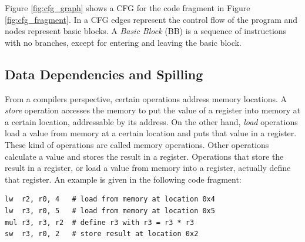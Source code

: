 Figure \ref{fig:cfg_graph} shows a CFG for the code fragment in Figure \ref{fig:cfg_fragment}. In a CFG edges represent the control flow of the program and nodes represent basic blocks. A \emph{Basic Block} (BB) is a sequence of instructions with no branches, except for entering and leaving the basic block.





\subsection{Data Dependencies and Spilling}\label{sec:data_dependencies}
From a compilers perspective, certain operations address memory locations. A \emph{store} operation accesses the memory to put the value of a register into memory at a certain location, addressable by its address. On the other hand, \emph{load} operations load a value from memory at a certain location and puts that value in a register. These kind of operations are called memory operations. Other operations calculate a value and stores the result in a register. Operations that store the result in a register, or load a value from memory into a register, actually define that register. An example is given in the following code fragment:

\begin{lstlisting}
lw  r2, r0, 4   # load from memory at location 0x4
lw  r3, r0, 5   # load from memory at location 0x5
mul r3, r3, r2  # define r3 with r3 = r3 * r3
sw  r3, r0, 2   # store result at location 0x2
\end{lstlisting}

